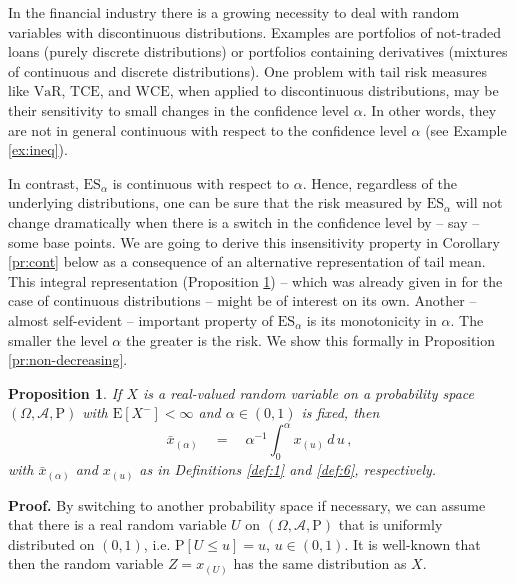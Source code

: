 \documentclass[11pt,a4paper,leqno]{article}
\newtheorem{proposition}[theorem]{Proposition}
\begin{document}
In the financial industry there is a growing necessity to deal with random
variables with discontinuous distributions. Examples are  portfolios of
not-traded loans (purely discrete distributions) or portfolios 
containing derivatives (mixtures of continuous and discrete distributions).
One problem with tail risk measures like $\mathrm{VaR}$, $\mathrm{TCE}$, and $\mathrm{WCE}$,
when applied to discontinuous distributions,
may be their sensitivity to small changes in the confidence level $\alpha$.
In other words, they are not in general continuous with respect to the
confidence level $\alpha$ (see Example \ref{ex:ineq}).

In contrast, $\mathrm{ES}_\alpha$ is continuous with respect to $\alpha$. Hence,
regardless of the underlying distributions, one can be sure that the risk measured
by $\mathrm{ES}_\alpha$ will not change dramatically when there is a switch
in the confidence level by -- say -- some base points.
We are going to derive this insensitivity property in Corollary \ref{pr:cont}
below as a consequence of an alternative representation of tail mean. This integral representation
(Proposition \ref{pr:integral})
-- which was already given in \cite{BLS00} for the case of continuous distributions --
might be of interest on its own.
Another -- almost self-evident --  important property of $\mathrm{ES}_\alpha$
is its monotonicity in $\alpha$. The smaller the level $\alpha$ the greater is the
risk. We show this formally in Proposition
\ref{pr:non-decreasing}. 

\begin{proposition}\label{pr:integral}
If $X$ is a real-valued random variable on a probability space 
$(\Omega, \mathcal{A}, \mathrm{P})$ with $\mathrm{E}[X^-] < \infty$ and 
$\alpha \in (0,1)$ is fixed, then
$$
\bar{x}_{(\alpha)} \quad = \quad \alpha^{-1} \int_0^\alpha x_{(u)}\,d\,u\,,
$$
with $\bar{x}_{(\alpha)}$ and $x_{(u)}$ as in Definitions \ref{def:1} and 
\ref{def:6}, respectively. 
\end{proposition}
%
\textbf{Proof.} By switching to another probability space if necessary, we can 
assume that there is a real random variable $U$ on $(\Omega, \mathcal{A}, \mathrm{P})$ that
is uniformly distributed on $(0,1)$, i.e. $\mathrm{P}[U \le u] = u$, $u \in (0,1)$. 
It is well-known that then the random
variable $Z = x_{(U)}$ has the same distribution as $X$.
\end{document}
